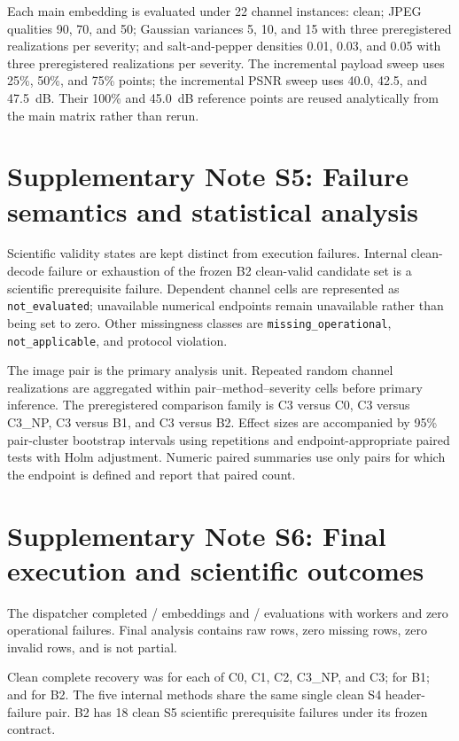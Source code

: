 \documentclass[10pt]{article}
\newcommand{\code}[1]{\texttt{#1}}
\begin{document}
Each main embedding is evaluated under 22 channel instances: clean; JPEG qualities 90, 70, and 50; Gaussian variances 5, 10, and 15 with three preregistered realizations per severity; and salt-and-pepper densities 0.01, 0.03, and 0.05 with three preregistered realizations per severity. The incremental payload sweep uses 25\%, 50\%, and 75\% points; the incremental PSNR sweep uses 40.0, 42.5, and 47.5~dB. Their 100\% and 45.0~dB reference points are reused analytically from the main matrix rather than rerun.

\section*{Supplementary Note S5: Failure semantics and statistical analysis}
Scientific validity states are kept distinct from execution failures. Internal clean-decode failure or exhaustion of the frozen B2 clean-valid candidate set is a scientific prerequisite failure. Dependent channel cells are represented as \code{not\_evaluated}; unavailable numerical endpoints remain unavailable rather than being set to zero. Other missingness classes are \code{missing\_operational}, \code{not\_applicable}, and protocol violation.

The image pair is the primary analysis unit. Repeated random channel realizations are aggregated within pair--method--severity cells before primary inference. The preregistered comparison family is C3 versus C0, C3 versus C3\_NP, C3 versus B1, and C3 versus B2. Effect sizes are accompanied by 95\% pair-cluster bootstrap intervals using \FinalBootstrap{} repetitions and endpoint-appropriate paired tests with Holm adjustment. Numeric paired summaries use only pairs for which the endpoint is defined and report that paired count.

\section*{Supplementary Note S6: Final execution and scientific outcomes}
The dispatcher completed \FinalEmbeddings{}/\FinalEmbeddings{} embeddings and \FinalEvaluations{}/\FinalEvaluations{} evaluations with \FinalWorkers{} workers and zero operational failures. Final analysis contains \FinalEvaluations{} raw rows, zero missing rows, zero invalid rows, and is not partial.

Clean complete recovery was \InternalCleanComplete{} for each of C0, C1, C2, C3\_NP, and C3; \BOneCleanComplete{} for B1; and \BTwoCleanComplete{} for B2. The five internal methods share the same single clean S4 header-failure pair. B2 has 18 clean S5 scientific prerequisite failures under its frozen contract.
\end{document}
